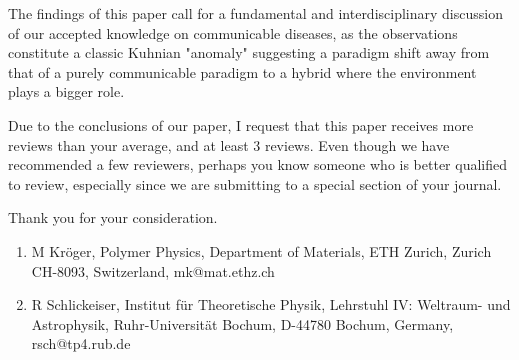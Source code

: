 \documentclass[11pt,a4paper,roman]{moderncv}
\begin{document}
The findings of this paper call for a fundamental and interdisciplinary discussion of our accepted knowledge on communicable diseases, as the observations constitute a classic Kuhnian "anomaly" suggesting a paradigm shift away from that of a purely communicable paradigm to a hybrid where the environment plays a bigger role.

Due to the conclusions of our paper, I request that this paper receives more reviews than your average, and at least 3 reviews. Even though we have recommended a few reviewers, perhaps you know someone who is better qualified to review, especially since we are submitting to a special section of your journal.

Thank you for your consideration.

\makeletterclosing
\newpage

\begin{enumerate}
\item M Kröger, Polymer Physics, Department of Materials, ETH Zurich, Zurich CH-8093, Switzerland, mk@mat.ethz.ch
\item R Schlickeiser, Institut für Theoretische Physik, Lehrstuhl IV: Weltraum- und Astrophysik, Ruhr-Universität Bochum, D-44780 Bochum, Germany, rsch@tp4.rub.de
\end{enumerate}


\end{document}
